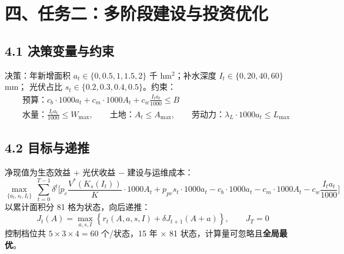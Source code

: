 \documentclass[11pt,a4paper]{ctexart}
\begin{document}
\section*{四、任务二：多阶段建设与投资优化}
\subsection*{4.1 决策变量与约束}
决策：年新增面积 $a_t\in\{0,0.5,1,1.5,2\}$ 千 hm$^2$；补水深度 $I_t\in\{0,20,40,60\}$ mm；
光伏占比 $s_t\in\{0.2,0.3,0.4,0.5\}$。约束：
\begin{align}
&\text{预算：} c_b\cdot1000a_t + c_m\cdot1000A_t + c_w\frac{I_ta_t}{1000}\le B\\
&\text{水量：} \frac{I_ta_t}{1000}\le W_{\max},\qquad
\text{土地：} A_t\le A_{\max},\qquad
\text{劳动力：} \lambda_L\cdot1000a_t\le L_{\max}
\end{align}
\subsection*{4.2 目标与递推}
净现值为生态效益 + 光伏收益 − 建设与运维成本：
\begin{equation}
\max_{\{a_t,s_t,I_t\}}\ \sum_{t=0}^{T-1}\delta^{t}\Big[p_e\frac{V^*(K_s(I_t))}{K}\cdot1000A_t+p_{pv}s_t\cdot1000a_t-c_b\cdot1000a_t-c_m\cdot1000A_t-c_w\frac{I_ta_t}{1000}\Big]
\end{equation}
以累计面积分 81 格为状态，向后递推：
\begin{equation}
J_t(A)=\max_{a,s,I}\left\{r_t(A,a,s,I)+\delta J_{t+1}(A+a)\right\},\qquad J_T=0
\end{equation}
控制档位共 $5\times3\times4=60$ 个/状态，15 年 × 81 状态，计算量可忽略且\textbf{全局最优}。
\end{document}
